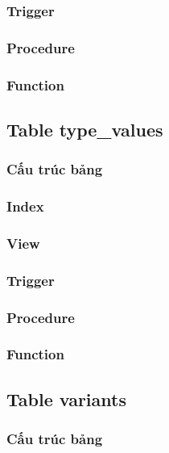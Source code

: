 \subsubsection{Trigger}

\subsubsection{Procedure}

\subsubsection{Function}

\subsection{Table type\_values}

\subsubsection{Cấu trúc bảng}

\subsubsection{Index}

\subsubsection{View}

\subsubsection{Trigger}

\subsubsection{Procedure}

\subsubsection{Function}

\subsection{Table variants}

\subsubsection{Cấu trúc bảng}

